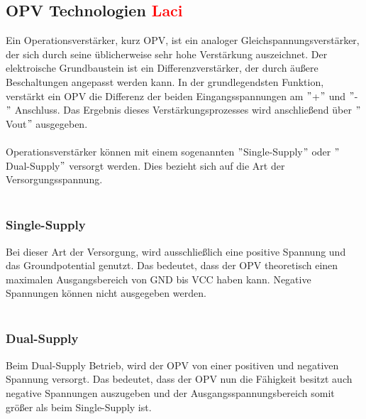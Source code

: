 \documentclass[titlepage,12pt,twoside]{article}
\begin{document}
\subsection{OPV Technologien \textcolor{red}{Laci}}
Ein Operationsverstärker, kurz OPV, ist ein analoger Gleichspannungsverstärker, der sich durch seine üblicherweise sehr hohe 
Verstärkung auszeichnet. Der elektroische Grundbaustein ist ein Differenzverstärker, der durch äußere Beschaltungen angepasst werden kann.
In der grundlegendsten Funktion, verstärkt ein OPV die Differenz der beiden Eingangsspannungen am $"$+$"$ und $"$-$"$ Anschluss. Das Ergebnis
dieses Verstärkungsprozesses wird anschließend über $"$Vout$"$ ausgegeben. \\
\\
Operationsverstärker können mit einem sogenannten $"$Single-Supply$"$ oder $"$Dual-Supply$"$ versorgt werden. Dies bezieht sich auf
die Art der Versorgungsspannung. \\
\\
\subsubsection{Single-Supply}
Bei dieser Art der Versorgung, wird ausschließlich eine positive Spannung und das Groundpotential genutzt. Das bedeutet, dass der OPV
theoretisch einen maximalen Ausgangsbereich von GND bis VCC haben kann. Negative Spannungen können nicht ausgegeben werden. \\
\\

\subsubsection{Dual-Supply}
Beim Dual-Supply Betrieb, wird der OPV von einer positiven und negativen Spannung versorgt. Das bedeutet, dass der OPV nun die Fähigkeit
besitzt auch negative Spannungen auszugeben und der Ausgangsspannungsbereich somit größer als beim Single-Supply ist.
\end{document}
